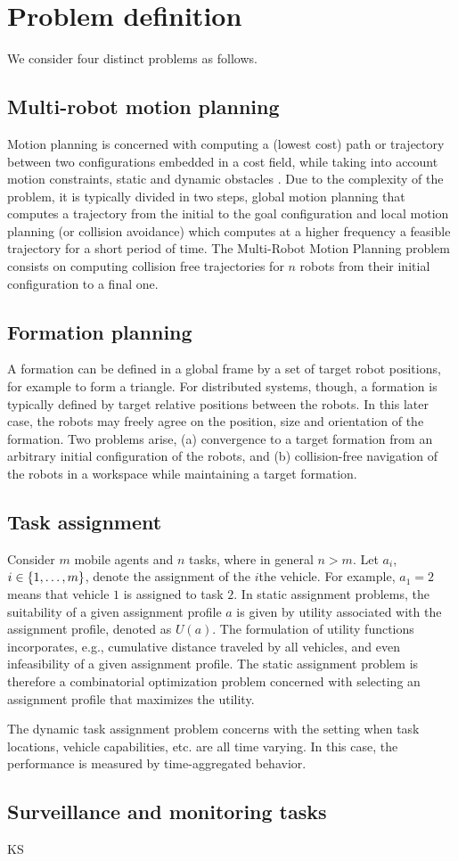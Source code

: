 
\section{Problem definition}\label{sec:2}

We consider four distinct problems as follows.

\subsection{Multi-robot motion planning}
Motion planning is concerned with computing a (lowest cost) path or trajectory between two configurations embedded in a cost field, while taking into account motion constraints, static and dynamic obstacles \citet{lavalle06}.
Due to the complexity of the problem, it is typically divided in two steps, global motion planning that computes a trajectory from the initial to the goal configuration and local motion planning (or collision avoidance) which computes at a higher frequency a feasible trajectory for a short period of time. The Multi-Robot Motion Planning problem consists on computing collision free trajectories for $n$ robots from their initial configuration to a final one.

\subsection{Formation planning}
A formation can be defined in a global frame by a set of target robot positions, for example to form a triangle. For distributed systems, though, a formation is typically defined by target relative positions between the robots. In this later case, the robots may freely agree on the position, size and orientation of the formation. Two problems arise, (a) convergence to a target formation from an arbitrary initial configuration of the robots, and (b) collision-free navigation of the robots in a workspace while maintaining a target formation.

\subsection{Task assignment}
Consider $m$ mobile agents and $n$ tasks, where in general $n > m$. Let $a_i$, $i \in \{1,\dots,m\}$, denote the assignment of the $i$the vehicle. For example, $a_1=2$ means that vehicle $1$ is assigned to task $2$. In static assignment problems, the suitability of a given assignment profile $a$ is given by utility associated with the assignment profile, denoted as $U(a)$. The formulation of utility functions incorporates, e.g., cumulative distance traveled by all vehicles, and even infeasibility of a given assignment profile. The static assignment problem is therefore a combinatorial optimization problem concerned with selecting an assignment profile that maximizes the utility.  

The dynamic task assignment problem concerns with the setting when task locations, vehicle capabilities, etc. are all time varying. In this case, the performance is measured by time-aggregated behavior.  

\subsection{Surveillance and monitoring tasks}
KS


